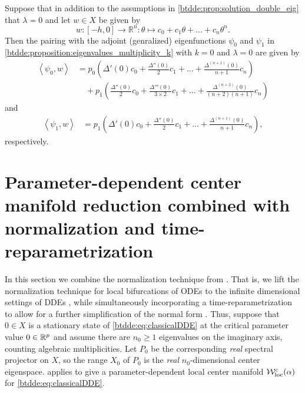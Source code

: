 \begin{lemma}
\label{btdde:lemma:pairing_with_adjoint_eigenfunctions}
Suppose that in addition to the assumptions in \cref{btdde:prop:solution_double_eig} that $\lambda = 0$ and
let $w\in X$ be given by
\[
    w \colon [-h,0] \rightarrow \mathbb R^n 
      \colon \theta \mapsto c_0 + c_1 \theta + \dots + c_n \theta^n.
\]
Then the pairing with the adjoint (genralized) eigenfunctions $\psi_0$ and
$\psi_1$ in \cref{btdde:proposition:eigenvalues_multiplicity_k} with $k=0$ and
$\lambda=0$ are given by
\begin{align*}
    \left< \psi_0, w \right> &=
    p_0 \left( \Delta'(0) c_0 + \frac{\Delta''(0)}2 c_1 + \dots + \frac{\Delta^{(n + 1)}(0)}{n + 1} c_n \right) \\
    & \quad + p_1 \left( \frac{\Delta''(0)}{2} c_0 + 
        \frac{\Delta'''(0)}{3\times 2} c_1 + \dots + \frac{\Delta^{(n + 2)}(0)}{(n + 2)(n + 1)} c_n \right)
\end{align*}
and
\begin{align*}
    \left< \psi_1, w \right> &=
    p_1 \left( \Delta'(0) c_0 + \frac{\Delta''(0)}2 c_1 + \dots + \frac{\Delta^{(n + 1)}(0)}{n + 1} c_n \right),
\end{align*}
respectively.
\end{lemma}


\section{Parameter-dependent center manifold reduction combined with normalization and time-reparametrization}
\label{btdde:sec:Center_manifold_reduction}

In this section we combine the normalization technique from
\cite{Bosschaert@Interplay,Switching2019}. That is, we lift the normalization technique
for local bifurcations of ODEs to the infinite dimensional settings of DDEs
\cite{Switching2019}, while simultaneously incorporating a time-reparametrization 
to allow for a further simplification of the normal form \cite{Bosschaert@Interplay}.
Thus, suppose that $0 \in X$ is a stationary state of \cref{btdde:eq:classicalDDE} at the
critical parameter value $0 \in \mathbb{R}^p$ and assume there are $n_0 \ge 1$
eigenvalues on the imaginary axis, counting algebraic multiplicities. Let $P_0$
be the corresponding \emph{real} spectral projector on $X$, so the range $X_0$
of $P_0$ is the \emph{real} $n_0$-dimensional center eigenspace.
\cite[Corollary 20]{Switching2019}  applies to give a parameter-dependent local
center manifold $\mathcal{W}^c_{\text{loc}}(\alpha)$ for \cref{btdde:eq:classicalDDE}.

